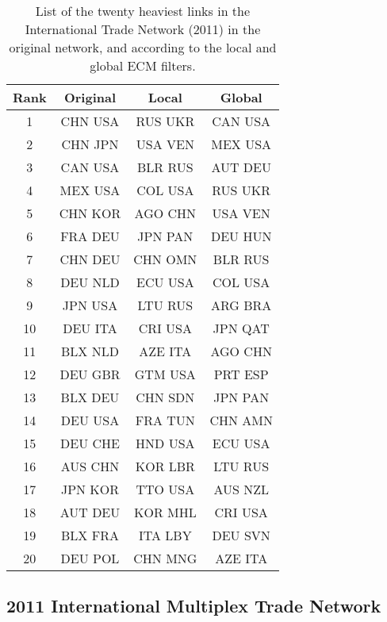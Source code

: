 \documentclass[aps,twocolumn,superscriptaddress]{revtex4-1}
\begin{document}
%
%
%
\begin{table}[ht!]
\centering
 \begin{small}
 \begin{tabular}{||c|c|c|c||} 
 \hline
 Rank & Original & Local & Global \\ [0.5ex] 
 \hline\hline
 1 & CHN USA & RUS UKR & CAN USA  \\ \hline
 2 & CHN JPN & USA VEN & MEX USA  \\ \hline
 3 & CAN USA & BLR RUS & AUT DEU  \\ \hline
 4 & MEX USA & COL USA & RUS UKR  \\ \hline
 5 & CHN KOR & AGO CHN & USA VEN  \\ \hline
 6 & FRA DEU & JPN PAN & DEU HUN  \\ \hline
 7 & CHN DEU & CHN OMN & BLR RUS  \\ \hline
 8 & DEU NLD & ECU USA & COL USA  \\ \hline
 9 & JPN USA & LTU RUS & ARG BRA  \\ \hline
 10 & DEU ITA & CRI USA & JPN QAT  \\ \hline
 11 & BLX NLD & AZE ITA & AGO CHN  \\ \hline
 12 & DEU GBR & GTM USA & PRT ESP  \\ \hline
 13 & BLX DEU & CHN SDN & JPN PAN  \\ \hline
 14 & DEU USA & FRA TUN & CHN AMN  \\ \hline
 15 & DEU CHE & HND USA & ECU USA  \\ \hline
 16 & AUS CHN & KOR LBR & LTU RUS  \\ \hline
 17 & JPN KOR & TTO USA & AUS NZL  \\ \hline
 18 & AUT DEU & KOR MHL & CRI USA  \\ \hline
 19 & BLX FRA & ITA LBY & DEU SVN  \\ \hline
 20 & DEU POL & CHN MNG & AZE ITA  \\ \hline
\end{tabular}
\end{small}
%
\caption{List of the twenty heaviest links in the International Trade Network (2011) in the original network, and according to the local and global ECM filters.}
\label{tab:tvg_trade_2011_top_20_heaviest}
%
\end{table}
%

\newpage

\subsection{2011 International Multiplex Trade Network}
\end{document}
